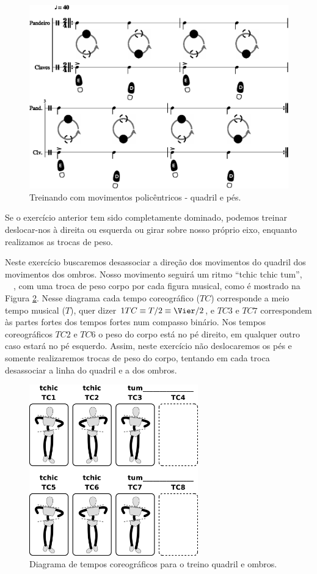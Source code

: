 \begin{figure}[!h]
  \centering
    \includegraphics[width=1.0\textwidth]{chapters/cap-body-isolation/bodycontrol2-1.eps}
\caption{Treinando com movimentos policêntricos - quadril e pés.}
\label{fig:pessoalpesquadril2}
\end{figure}

Se o exercício anterior tem sido completamente dominado, podemos treinar deslocar-nos
à direita ou esquerda ou girar sobre nosso próprio eixo, 
enquanto realizamos as trocas de peso.

\begin{example}
Neste exercício buscaremos desassociar a direção dos movimentos do quadril
dos movimentos dos ombros.
Nosso movimento seguirá um ritmo ``tchic tchic tum'', 
\leftrepeat~\Vier\Acht\Acht~\rightrepeat, 
com uma troca de peso corpo por cada figura musical,
como é mostrado na Figura \ref{fig:pessoalombroquadril1}.
Nesse diagrama cada tempo coreográfico ($TC$)
corresponde a meio tempo musical ($T$), quer dizer $1 TC\equiv  T/2\equiv \Vier/2$,
e $TC3$ e $TC7$ correspondem às partes fortes dos tempos fortes num compasso binário.
Nos tempos coreográficos $TC2$ e $TC6$ o peso do corpo está no pé direito, 
em qualquer outro caso estará no pé esquerdo. 
Assim, neste exercício não deslocaremos os pés e
somente realizaremos trocas de peso do corpo, 
tentando em cada troca desassociar a linha do quadril e a dos ombros.

\end{example}

\begin{figure}[!h]
  \centering
  \includegraphics[width=0.65\textwidth]{chapters/cap-body-isolation/postura-ombro2.eps}
\caption{Diagrama de tempos coreográficos para o treino quadril e ombros.}
\label{fig:pessoalombroquadril1}
\end{figure}
